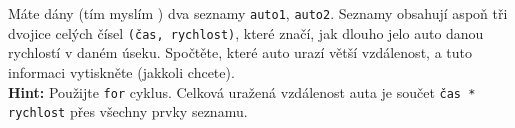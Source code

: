 \question[70]
Máte dány (tím myslím ) dva seznamy \texttt{auto1},
\texttt{auto2}. Seznamy obsahují aspoň tři dvojice celých čísel \texttt{(čas,
	rychlost)}, které značí,
jak dlouho jelo auto danou rychlostí v daném úseku.
Spočtěte, které auto urazí
větší vzdálenost, a tuto informaci vytiskněte
(jakkoli chcete).\\
\textbf{Hint:} Použijte \texttt{for} cyklus. Celková
uražená vzdálenost auta je
součet \texttt{čas * rychlost} přes všechny prvky
seznamu.